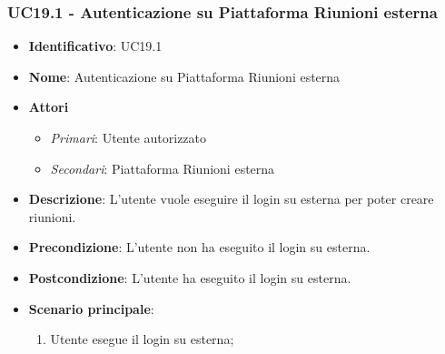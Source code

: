 \subsubsection{UC19.1 - Autenticazione su Piattaforma Riunioni esterna }
\begin{itemize}
	\item \textbf{Identificativo}: UC19.1
	\item \textbf{Nome}: Autenticazione su Piattaforma Riunioni esterna
	\item \textbf{Attori}
	\begin{itemize} 
		\item \textit{Primari}: Utente autorizzato
		\item \textit{Secondari}: Piattaforma Riunioni esterna
	\end{itemize}
	\item \textbf{Descrizione}: L'utente vuole eseguire il login su  esterna per poter creare riunioni.
	\item \textbf{Precondizione}: L'utente non ha eseguito il login su  esterna.
	\item \textbf{Postcondizione}: L'utente ha eseguito il login su  esterna.
	\item \textbf{Scenario principale}: \begin{enumerate}
		\item Utente esegue il login su  esterna; 
	\end{enumerate}
\end{itemize}

